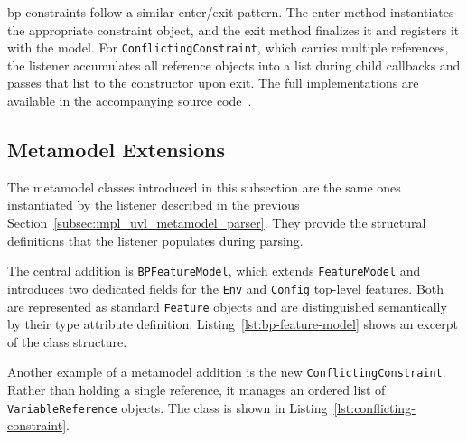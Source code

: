 

\gls{bp} constraints follow a similar enter/exit pattern.
The enter method instantiates the appropriate constraint object, and the exit method finalizes it and registers it with the model.
For \texttt{ConflictingConstraint}, which carries multiple references, the listener accumulates all reference objects into a list during child callbacks and passes that list to the constructor upon exit.
The full implementations are available in the accompanying source code~\cite{ruider_xxnicksdaxxma-nick-ruider_2026}.

\subsection{Metamodel Extensions}
\label{subsec:impl_uvl_metamodel_java_extension}

The metamodel classes introduced in this subsection are the same ones instantiated by the listener described in the previous Section~\ref{subsec:impl_uvl_metamodel_parser}.
They provide the structural definitions that the listener populates during parsing.

The central addition is \texttt{BPFeatureModel}, which extends \texttt{FeatureModel} and introduces two dedicated fields for the \texttt{Env} and \texttt{Config} top-level features.
Both are represented as standard \texttt{Feature} objects and are distinguished semantically by their type attribute definition.
Listing~\ref{lst:bp-feature-model} shows an excerpt of the class structure.





Another example of a metamodel addition is the new \texttt{ConflictingConstraint}.
Rather than holding a single reference, it manages an ordered list of \texttt{VariableReference} objects.
The class is shown in Listing~\ref{lst:conflicting-constraint}.

